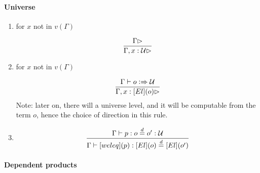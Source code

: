 \documentclass[11pt]{article}
\newcommand{\eqd}{\stackrel{d}{=}}
\newcommand{\Eu}{{\cal U}}
\newcommand{\synth}{\vcentcolon\Rightarrow}
\begin{document}
\paragraph{Universe}

\begin{enumerate}
\item for $x$ not in $v(\Gamma)$

$$\frac{\Gamma\rhd}{\Gamma,x:\Eu\rhd}$$

\item for $x$ not in $v(\Gamma)$

$$\frac{\Gamma\vdash o \synth \Eu}{\Gamma, x:[El](o)\rhd}$$
Note: later on, there will a universe level, and it will be computable from the
term $o$, hence the choice of direction in this rule.

\item 

$$\frac{\Gamma\vdash p : o \eqd o' : \Eu}{\Gamma\vdash [weleq](p) : [El](o) \eqd [El](o')}$$

\end{enumerate}







\paragraph{Dependent products}
\end{document}
